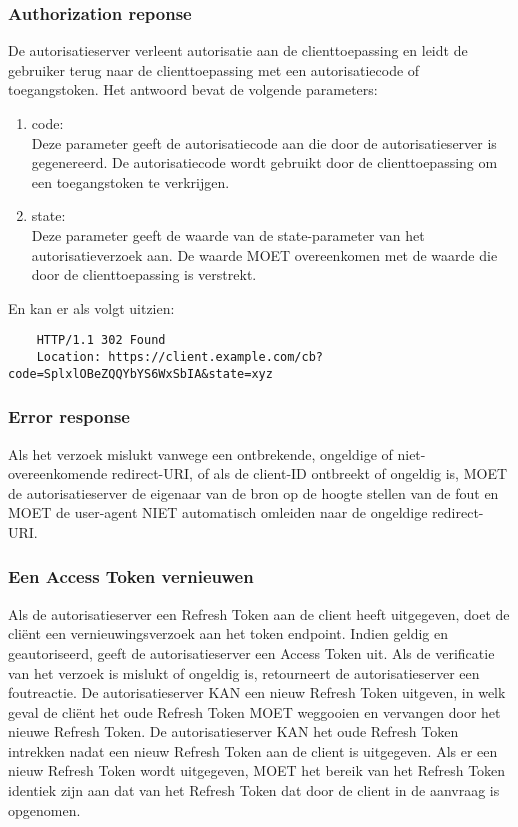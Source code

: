 \subsubsection{Authorization reponse}%
\label{subsubsec:authorization-reponse}
De autorisatieserver verleent autorisatie aan de clienttoepassing en leidt de gebruiker terug naar de clienttoepassing met een autorisatiecode of toegangstoken. Het antwoord bevat de volgende parameters:
\begin{enumerate}[label=\textbf{-}]
    \item code: \\
    Deze parameter geeft de autorisatiecode aan die door de autorisatieserver is gegenereerd. De autorisatiecode wordt gebruikt door de clienttoepassing om een toegangstoken te verkrijgen.
  
    \item state: \\
    Deze parameter geeft de waarde van de state-parameter van het autorisatieverzoek aan. De waarde MOET overeenkomen met de waarde die door de clienttoepassing is verstrekt.
  \end{enumerate}
  En kan er als volgt uitzien:
  \begin{verbatim}
    HTTP/1.1 302 Found
    Location: https://client.example.com/cb?code=SplxlOBeZQQYbYS6WxSbIA&state=xyz
  \end{verbatim}

\subsubsection{Error response}%
\label{subsubsec:error-response}
Als het verzoek mislukt vanwege een ontbrekende, ongeldige of niet-overeenkomende redirect-URI, of als de client-ID ontbreekt of ongeldig is, MOET de autorisatieserver de eigenaar van de bron op de hoogte stellen van de fout en MOET de user-agent NIET automatisch omleiden naar de ongeldige redirect-URI.

\subsubsection{Een Access Token vernieuwen}%
\label{subsubsec:een-access-token-vernieuwen}
Als de autorisatieserver een Refresh Token aan de client heeft uitgegeven, doet de cliënt een vernieuwingsverzoek aan het token endpoint.
Indien geldig en geautoriseerd, geeft de autorisatieserver een Access Token uit. Als de verificatie van het verzoek is mislukt of ongeldig is, retourneert de autorisatieserver een foutreactie.
De autorisatieserver KAN een nieuw Refresh Token uitgeven, in welk geval de cliënt het oude Refresh Token MOET weggooien en vervangen door het nieuwe Refresh Token. De autorisatieserver KAN het oude Refresh Token intrekken nadat een nieuw Refresh Token aan de client is uitgegeven. Als er een nieuw Refresh Token wordt uitgegeven, MOET het bereik van het Refresh Token identiek zijn aan dat van het Refresh Token dat door de client in de aanvraag is opgenomen.

